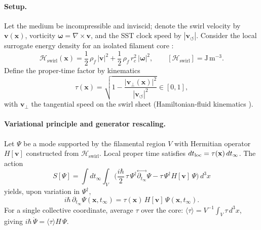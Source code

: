 \documentclass[10pt,reprint,aps,onecolumn,nofootinbib]{revtex4-2}
\begin{document}
    \paragraph{Setup.}
        Let the medium be incompressible and inviscid; denote the swirl velocity by
        \(\mathbf{v}(\mathbf{x})\),
        vorticity \(\boldsymbol{\omega}=\nabla\times\mathbf{v}\),
        and the SST clock speed by \(|\mathbf{v}_{\!\boldsymbol{\circlearrowleft}}|\).
        Consider the local surrogate energy density for an isolated filament core
        \cite{Saffman1992,Batchelor1967,LandauFM}:
        \begin{equation}
        \mathcal{H}_{\text{swirl}}(\mathbf{x})=\frac{1}{2}\,\rho_{\!f}\,|\mathbf{v}|^{2}
        +\frac{1}{2}\,\rho_{\!f}\,r_c^{2}\,|\boldsymbol{\omega}|^{2},
        \qquad
        [\mathcal{H}_{\text{swirl}}]=\mathrm{J\,m^{-3}}.
        \end{equation}
        Define the proper‐time factor by kinematics
        \begin{equation}
        \tau(\mathbf{x})=\sqrt{1-\frac{|\mathbf{v}_\perp(\mathbf{x})|^{2}}{|\mathbf{v}_{\!\boldsymbol{\circlearrowleft}}|^{2}}}\in[0,1],
        \end{equation}
        with \(\mathbf{v}_\perp\) the tangential speed on the swirl sheet (Hamiltonian-fluid kinematics
        \cite{Salmon1988,Morrison1998}).

    \paragraph{Variational principle and generator rescaling.}
        Let \(\Psi\) be a mode supported by the filamental region \(V\) with Hermitian operator
        \(H[\mathbf{v}]\) constructed from \(\mathcal{H}_{\text{swirl}}\).
        Local proper time satisfies \(dt_{\rm loc}=\tau(\mathbf{x})\,dt_\infty\). The action
        \[
            S[\Psi]=\int dt_{\infty}\!\!\int_V \Big(
            \frac{i\hbar}{2}\,\tau\,\Psi^\dagger\!\stackrel{\leftrightarrow}{\partial_{t_\infty}}\!\Psi
            -\tau\,\Psi^\dagger H[\mathbf{v}]\,\Psi\Big)\,d^{3}x
        \]
        yields, upon variation in \(\Psi^\dagger\),
        \begin{equation}
        i\hbar\,\partial_{t_\infty}\Psi(\mathbf{x},t_\infty)
        =\tau(\mathbf{x})\,H[\mathbf{v}]\,\Psi(\mathbf{x},t_\infty).
        \end{equation}
        For a single collective coordinate, average \(\tau\) over the core:
        \(\langle\tau\rangle=V^{-1}\!\int_V \tau\,d^3x\), giving
        \(i\hbar\,\dot\Psi=\langle\tau\rangle H\,\Psi\).
\end{document}
